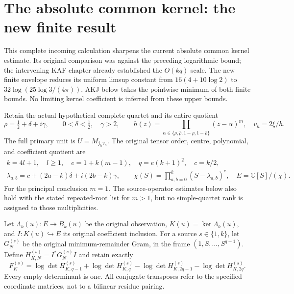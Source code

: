 \documentclass[11pt,a4paper]{article}
\begin{document}

\clearpage
\section{The absolute common kernel: the new finite result}
\label{sec:AKS}

This complete incoming calculation sharpens the current absolute common
kernel estimate. Its original comparison was against the preceding
logarithmic bound; the intervening KAF chapter already established
the $O(kq)$ scale. The new finite envelope reduces its uniform limsup
constant from $16(4+10\log2)$ to $32\log(25\log3/(4\pi))$.
AKJ below takes the pointwise minimum of both finite bounds. No
limiting kernel coefficient is inferred from these upper bounds.

Retain the actual hypothetical complete quartet and its entire quotient
\[
 \rho=\tfrac12+\delta+i\gamma,\qquad 0<\delta<\tfrac12,\quad \gamma>2,
 \qquad h(z)=\prod_{\alpha\in\{\rho,\bar\rho,1-\rho,1-\bar\rho\}}
 (z-\alpha)^m,\quad v_h=2\xi/h.
\]
The full primary unit is $U=M_{j_hv_h}$. The original tensor order, centre,
polynomial, and coefficient quotient are
\[
\begin{gathered}
 k=4l+1,\quad l\ge1,\quad e=1+k(m-1),\quad q=e(k+1)^2,\quad c=k/2,\\
 \lambda_{a,b}=c+(2a-k)\delta+i(2b-k)\gamma,\qquad
 \chi(S)=\prod_{a,b=0}^k(S-\lambda_{a,b})^e,
 \quad E=\mathbb C[S]/(\chi).
\end{gathered}\tag{AKS1}
\]
For the principal conclusion $m=1$. The source-operator estimates below
also hold with the stated repeated-root list for $m>1$, but no simple-quartet
rank is assigned to those multiplicities.

Let $\Lambda_k(u):E\twoheadrightarrow B_k(u)$ be the original observation,
$K(u)=\ker\Lambda_k(u)$, and $I:K(u)\hookrightarrow E$ its original
coefficient inclusion. For a source $s\in\{1,k\}$, let $G_N^{(s)}$ be the
original minimum-remainder Gram, in the frame $(1,S,\ldots,S^{q-1})$.
Define $H_{K,N}^{(s)}=I^*G_N^{(s)}I$ and retain exactly
\[
 F_K^{(s)}=
 \log\det H_{K,q-1}^{(s)}+\log\det H_{K,q}^{(s)}
 -\log\det H_{K,2q-1}^{(s)}-\log\det H_{K,2q}^{(s)}.
 \tag{AKS2}
\]
Every empty determinant is one. All conjugate transposes refer to the
specified coordinate matrices, not to a bilinear residue pairing.
\end{document}

